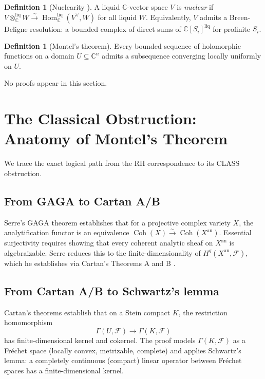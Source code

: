 \documentclass[11pt,a4paper]{article}
\theoremstyle{plain}
\theoremstyle{definition}
\newtheorem{definition}[theorem]{Definition}
\newcommand{\CLASS}{\textsf{CLASS}}
\newcommand{\C}{\mathbb{C}}
\DeclareMathOperator{\Hom}{Hom}
\DeclareMathOperator{\Coh}{Coh}
\begin{document}
\begin{definition}[Nuclearity {\cite{ClausenScholze2022}}]\label{def:nuclear}
A liquid $\C$-vector space $V$ is \emph{nuclear} if $V \otimes_{\C}^{\mathrm{liq}} W \xrightarrow{\sim} \Hom_{\C}^{\mathrm{liq}}(V^\vee, W)$ for all liquid $W$.
Equivalently, $V$ admits a Breen-Deligne resolution: a bounded complex of direct sums of $\C[S_i]^{\mathrm{liq}}$ for profinite $S_i$.
\end{definition}

\begin{definition}[Montel's theorem]\label{def:montel}
Every bounded sequence of holomorphic functions on a domain $U \subseteq \C^n$ admits a subsequence converging locally uniformly on $U$.
\end{definition}

No proofs appear in this section.

\section{The Classical Obstruction: Anatomy of Montel's Theorem}
\label{sec:classical}

We trace the exact logical path from the RH correspondence to its \CLASS{} obstruction.

\subsection{From GAGA to Cartan A/B}

Serre's GAGA theorem \cite{Serre1956} establishes that for a projective complex variety $X$, the analytification functor is an equivalence $\Coh(X) \xrightarrow{\sim} \Coh(X^{\mathrm{an}})$.
Essential surjectivity requires showing that every coherent analytic sheaf on $X^{\mathrm{an}}$ is algebraizable.
Serre reduces this to the finite-dimensionality of $H^q(X^{\mathrm{an}}, \mathcal{F})$, which he establishes via Cartan's Theorems A and B \cite{Cartan1953}.

\subsection{From Cartan A/B to Schwartz's lemma}

Cartan's theorems establish that on a Stein compact $K$, the restriction homomorphism
\[
\Gamma(U, \mathcal{F}) \to \Gamma(K, \mathcal{F})
\]
has finite-dimensional kernel and cokernel.
The proof models $\Gamma(K, \mathcal{F})$ as a Fréchet space (locally convex, metrizable, complete) and applies Schwartz's lemma: a completely continuous (compact) linear operator between Fréchet spaces has a finite-dimensional kernel.
\end{document}
